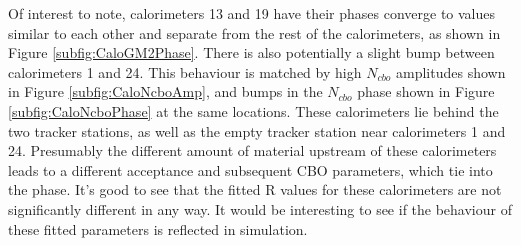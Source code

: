 	Of interest to note, calorimeters 13 and 19 have their \gmtwo phases converge to values similar to each other and separate from the rest of the calorimeters, as shown in Figure \ref{subfig:CaloGM2Phase}. There is also potentially a slight bump between calorimeters 1 and 24. This behaviour is matched by high $N_{cbo}$ amplitudes shown in Figure \ref{subfig:CaloNcboAmp}, and bumps in the $N_{cbo}$ phase shown in Figure \ref{subfig:CaloNcboPhase} at the same locations. These calorimeters lie behind the two tracker stations, as well as the empty tracker station near calorimeters 1 and 24. Presumably the different amount of material upstream of these calorimeters leads to a different acceptance and subsequent CBO parameters, which tie into the \gmtwo phase. It's good to see that the fitted R values for these calorimeters are not significantly different in any way. It would be interesting to see if the behaviour of these fitted parameters is reflected in simulation.

